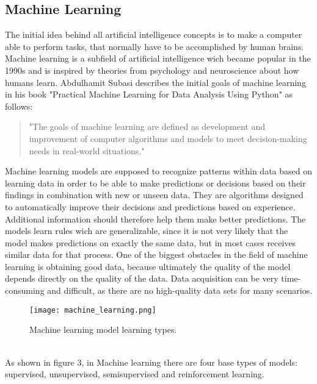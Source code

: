 \documentclass[../masterarbeit.tex]{subfiles}
\begin{document}
	














\subsection{Machine Learning}
The initial idea behind all artificial intelligence concepts is to make a computer able to perform tasks, that normally have to be accomplished by human brains. Machine learning is a subfield of artificial intelligence wich became popular in the 1990s and is inspired by theories from psychology and neuroscience about how humans learn. \autocite[]{VIEIRA20201} \autocite[]{SUBASI202091}
Abdulhamit Subasi describes the initial goals of machine learning in his book "Practical Machine Learning for Data Analysis Using Python" as follows:
\begin{quote}
	"The goals of machine learning are defined as development and improvement of
computer algorithms and models to meet decision-making needs in real-world situations." \autocite{SUBASI202091}
\end{quote}
Machine learning models are supposed to recognize patterns within data based on learning data in order to be able to make predictions or decisions based on their findings in combination with new or unseen data. They are algorithms designed to automatically improve their decisions and predictions based on experience. Additional information should therefore help them make better predictions. The models learn rules wich are generalizable, since it is not very likely that the model makes predictions on exactly the same data, but in most cases receives similar data for that process. \autocite[]{VIEIRA20201}
One of the biggest obstacles in the field of machine learning is obtaining good data, because ultimately the quality of the model depends directly on the quality of the data. Data acquisition can be very time-consuming and difficult, as there are no high-quality data sets for many scenarios. \autocite[]{SUBASI202091}
\begin{figure}[h]
    \centering
    \texttt{[image: machine\_learning.png]}
    \caption{Machine learning model learning types.}
\end{figure} \\
As shown in figure 3, in Machine learning there are four base types of models: supervised, unsupervised, semisupervised and reinforcement learning. \autocite[]{VIEIRA20201} \autocite[]{ibm-supervised-learning:2022} \autocite[]{PISNER2020101}
\end{document}
